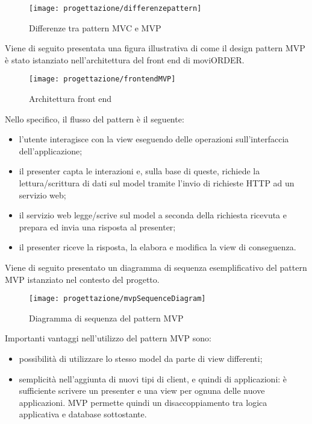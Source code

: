 \begin{figure}[!h] 
    \centering 
    \texttt{[image: progettazione/differenzepattern]} 
    \caption{Differenze tra pattern MVC e MVP}
\end{figure}

Viene di seguito presentata una figura illustrativa di come il design pattern MVP è stato istanziato nell'architettura del front end di moviORDER.

\begin{figure}[!h] 
    \centering 
    \texttt{[image: progettazione/frontendMVP]} 
    \caption{Architettura front end}
\end{figure}

Nello specifico, il flusso del pattern è il seguente:
\begin{itemize}
	\item l'utente interagisce con la view eseguendo delle operazioni sull'interfaccia dell'applicazione;
	\item il presenter capta le interazioni e, sulla base di queste, richiede la lettura/scrittura di dati sul model tramite l'invio di richieste HTTP ad un servizio web;
	\item il servizio web legge/scrive sul model a seconda della richiesta ricevuta e prepara ed invia una risposta al presenter;
	\item il presenter riceve la risposta, la elabora e modifica la view di conseguenza.
\end{itemize}
Viene di seguito presentato un diagramma di sequenza esemplificativo del pattern MVP istanziato nel contesto del progetto.

\begin{figure}[!h] 
    \centering 
    \texttt{[image: progettazione/mvpSequenceDiagram]} 
    \caption{Diagramma di sequenza del pattern MVP}
\end{figure}

Importanti vantaggi nell'utilizzo del pattern MVP sono:
\begin{itemize}
	\item possibilità di utilizzare lo stesso model da parte di view differenti;
	\item semplicità nell'aggiunta di nuovi tipi di client, e quindi di applicazioni: è sufficiente scrivere un presenter e una view per ognuna delle nuove applicazioni. MVP permette quindi un disaccoppiamento tra logica applicativa e database sottostante.
\end{itemize}

